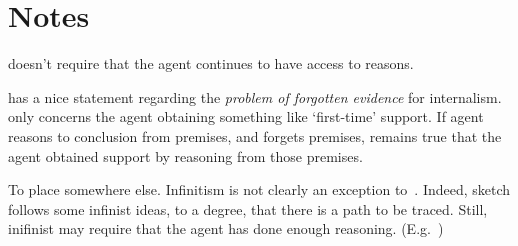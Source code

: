 \section{Notes}
\label{sec:notes}

\begin{note}[Memory]
  \ESU{} doesn't require that the agent continues to have access to reasons.

  \textcite[208]{Goldman:1999tr} has a nice statement regarding the \emph{problem of forgotten evidence} for internalism.
  \ESU{} only concerns the agent obtaining something like `first-time' support.
  If agent reasons to conclusion from premises, and forgets premises, remains true that the agent obtained support by reasoning from those premises.
\end{note}


\begin{note}
  {
    \color{red}
    To place somewhere else.
  }
  Infinitism is not clearly an exception to~\ESU{}.
  Indeed, sketch follows some infinist ideas, to a degree, that there is a path to be traced.
  Still, inifinist may require that the agent has done enough reasoning.
  (E.g.\ \textcite[10]{Klein:2007ve})
\end{note}

